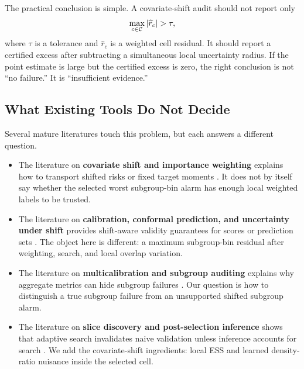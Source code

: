 The practical conclusion is simple. A covariate-shift audit should not report only
\[
\max_{c\in\cC}|\widehat r_c|>\tau ,
\]
where \(\tau\) is a tolerance and \(\widehat r_c\) is a weighted cell residual. It should report a certified excess after subtracting a simultaneous local uncertainty radius. If the point estimate is large but the certified excess is zero, the right conclusion is not ``no failure.'' It is ``insufficient evidence.''

\subsection{What Existing Tools Do Not Decide}

Several mature literatures touch this problem, but each answers a different question.

\begin{itemize}
  \item The literature on \textbf{covariate shift and importance weighting} explains how to transport shifted risks or fixed target moments \citep{Sugiyama2007IWCV,Cortes2010IW,Polo2022ESS}. It does not by itself say whether the selected worst subgroup-bin alarm has enough local weighted labels to be trusted.
  \item The literature on \textbf{calibration, conformal prediction, and uncertainty under shift} provides shift-aware validity guarantees for scores or prediction sets \citep{Guo2017Calibration,Park2020CalibratedShift,Tibshirani2019WeightedCP,Yang2024DRCalibration}. The object here is different: a maximum subgroup-bin residual after weighting, search, and local overlap variation.
  \item The literature on \textbf{multicalibration and subgroup auditing} explains why aggregate metrics can hide subgroup failures \citep{HebertJohnson2018Multicalibration,Kearns2018FairnessGerrymandering,Wu2024MCOOD,Zhang2024FairRiskControl}. Our question is how to distinguish a true subgroup failure from an unsupported shifted subgroup alarm.
  \item The literature on \textbf{slice discovery and post-selection inference} shows that adaptive search invalidates naive validation unless inference accounts for search \citep{Chung2019SliceFinder,Eyuboglu2022Domino,Berk2013PostSelection,Dwork2015ReusableHoldout,Angelopoulos2021LearnThenTest}. We add the covariate-shift ingredients: local ESS and learned density-ratio nuisance inside the selected cell.
\end{itemize}

